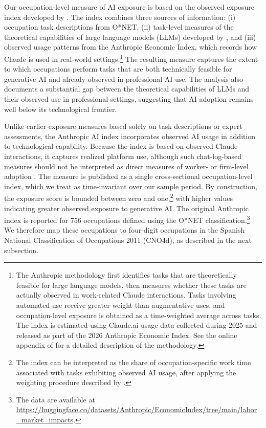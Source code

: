 Our occupation-level measure of AI exposure is based on the observed exposure index developed by \citet{massenkoff_mccrory_2026}. The index combines three sources of information: (i) occupation task descriptions from O*NET, (ii) task-level measures of the theoretical capabilities of large language models (LLMs) developed by \citet{eloundou_manning_mishkin_rock_2024}, and (iii) observed usage patterns from the Anthropic Economic Index, which records how Claude is used in real-world settings.\footnote{The Anthropic methodology first identifies tasks that are theoretically feasible for large language models, then measures whether these tasks are actually observed in work-related Claude interactions. Tasks involving automated use receive greater weight than augmentative uses, and occupation-level exposure is obtained as a time-weighted average across tasks. The index is estimated using Claude.ai usage data collected during 2025 and released as part of the 2026 Anthropic Economic Index. See the online appendix of \citet{massenkoff_mccrory_2026} for a detailed description of the methodology.} The resulting measure captures the extent to which occupations perform tasks that are both technically feasible for generative AI and already observed in professional AI use. The analysis also documents a substantial gap between the theoretical capabilities of LLMs and their observed use in professional settings, suggesting that AI adoption remains well below its technological frontier.

Unlike earlier exposure measures based solely on task descriptions or expert assessments, the Anthropic AI index incorporates observed AI usage in addition to technological capability. Because the index is based on observed Claude interactions, it captures realized platform use, although such chat-log-based measures should not be interpreted as direct measures of worker- or firm-level adoption \citep{bick_et_al_2026}. The measure is published as a single cross-sectional occupation-level index, which we treat as time-invariant over our sample period. By construction, the exposure score is bounded between zero and one,\footnote{The index can be interpreted as the share of occupation-specific work time associated with tasks exhibiting observed AI usage, after applying the weighting procedure described by \citet{massenkoff_mccrory_2026}.} with higher values indicating greater observed exposure to generative AI. The original Anthropic index is reported for 756 occupations defined using the O*NET classification.\footnote{The data are available at \url{https://huggingface.co/datasets/Anthropic/EconomicIndex/tree/main/labor_market_impacts}.} We therefore map these occupations to four-digit occupations in the Spanish National Classification of Occupations 2011 (CNO4d), as described in the next subsection.

